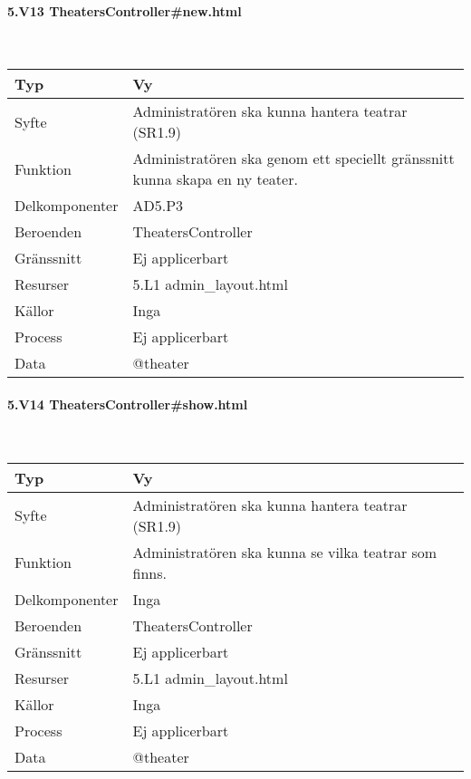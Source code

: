 \documentclass[a4paper, twoside, 11pt, titlepage]{article}
\begin{document}
			\paragraph{5.V13 TheatersController\#new.html}\

			\begin {table} [ht] \begin{tabular} {  p{3.5cm} p{9.6cm} }
				\hline
				{Typ} & {Vy} \\
				\hline
				{Syfte} & {Administratören ska kunna hantera teatrar (SR1.9)} \\
				\hline
				{Funktion} & {Administratören ska genom ett speciellt gränssnitt kunna skapa en ny teater.} \\
				\hline
				{Delkomponenter} & {AD5.P3} \\
				\hline
				{Beroenden} & {TheatersController} \\
				\hline
				{Gränssnitt} & {Ej applicerbart} \\
				\hline
				{Resurser} & {5.L1 admin\_layout.html} \\
				\hline
				{Källor} & {Inga} \\
				\hline
				{Process} & {Ej applicerbart} \\
				\hline
				{Data} & {@theater} \\
				\hline
			\end{tabular} \end{table} \FloatBarrier


			\paragraph{5.V14 TheatersController\#show.html}\

			\begin {table} [ht] \begin{tabular} {  p{3.5cm} p{9.6cm} }
				\hline
				{Typ} & {Vy} \\
				\hline
				{Syfte} & {Administratören ska kunna hantera teatrar (SR1.9)} \\
				\hline
				{Funktion} & {Administratören ska kunna se vilka teatrar som finns.} \\
				\hline
				{Delkomponenter} & {Inga} \\
				\hline
				{Beroenden} & {TheatersController} \\
				\hline
				{Gränssnitt} & {Ej applicerbart} \\
				\hline
				{Resurser} & {5.L1 admin\_layout.html} \\
				\hline
				{Källor} & {Inga} \\
				\hline
				{Process} & {Ej applicerbart} \\
				\hline
				{Data} & {@theater} \\
				\hline
			\end{tabular} \end{table} \FloatBarrier
\end{document}
